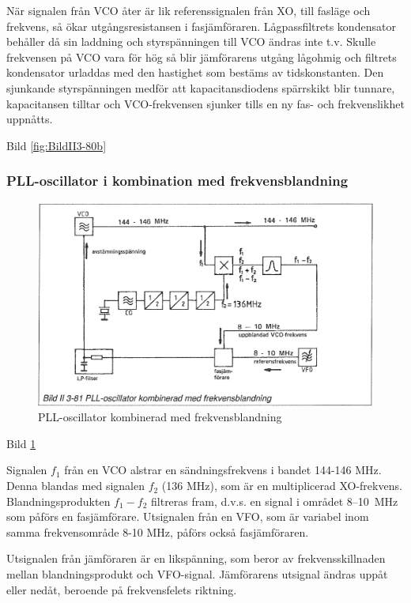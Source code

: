 När signalen från VCO åter är lik referenssignalen från XO, till
fasläge och frekvens, så ökar utgångsresistansen i
fasjämföraren. Lågpassfiltrets kondensator behåller då sin laddning
och styrspänningen till VCO ändras inte t.v. Skulle frekvensen på VCO
vara för hög så blir jämförarens utgång lågohmig och filtrets
kondensator urladdas med den hastighet som bestäms av tidskonstanten.
Den sjunkande styrspänningen medför att kapacitansdiodens
spärrskikt blir tunnare, kapacitansen tilltar och VCO-frekvensen
sjunker tills en ny fas- och frekvenslikhet uppnåtts.

Bild \ref{fig:BildII3-80b}

\subsubsection{PLL-oscillator i kombination med frekvensblandning}

\begin{figure}
\includegraphics[width=\textwidth]{images/bild_2_3-81}
\caption{PLL-oscillator kombinerad med frekvensblandning}
\label{fig:BildII3-81}
\end{figure}

Bild \ref{fig:BildII3-81}

Signalen \(f_1\) från en VCO alstrar en sändningsfrekvens i bandet
144-146 MHz. Denna blandas med signalen \(f_2\) (136 MHz), som är en
multiplicerad XO-frekvens. Blandningsprodukten \(f_1 - f_2\) filtreras
fram, d.v.s. en signal i området 8--10~MHz som påförs en fasjämförare.
Utsignalen från en VFO, som är variabel inom samma frekvensområde 8-10
MHz, påförs också fasjämföraren.

Utsignalen från jämföraren är en likspänning, som beror av
frekvensskillnaden mellan blandningsprodukt och
VFO-signal. Jämförarens utsignal ändras uppåt eller nedåt, beroende på
frekvensfelets riktning.


